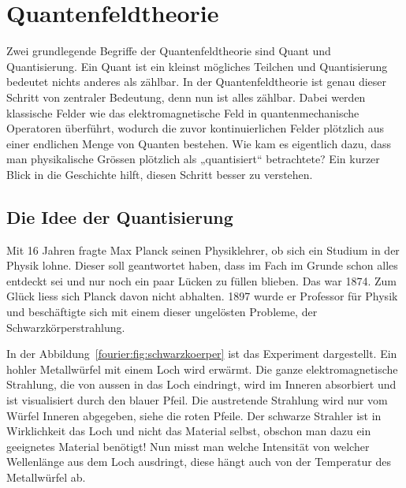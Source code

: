 %
%
%
%
\section{Quantenfeldtheorie\label{fourier:section:quantenfeldtheorie}}
Zwei grundlegende Begriffe der Quantenfeldtheorie sind Quant und Quantisierung. 
Ein Quant ist ein kleinst mögliches Teilchen und Quantisierung bedeutet nichts anderes als zählbar. 
In der Quantenfeldtheorie ist genau dieser Schritt von zentraler Bedeutung, denn nun ist alles zählbar. 
Dabei werden klassische Felder wie das elektromagnetische Feld in quantenmechanische Operatoren überführt, wodurch die zuvor kontinuierlichen Felder plötzlich aus einer endlichen Menge von Quanten bestehen.
Wie kam es eigentlich dazu, dass man physikalische Grössen plötzlich als „quantisiert“ betrachtete?
Ein kurzer Blick in die Geschichte hilft, diesen Schritt besser zu verstehen.

\subsection{Die Idee der Quantisierung\label{fourier:subsection:DieIdeeDerQuantisierung}}
	Mit 16 Jahren fragte Max Planck seinen Physiklehrer, ob sich ein Studium in der Physik lohne. 
	Dieser soll geantwortet haben, dass im Fach im Grunde schon alles entdeckt sei und nur noch ein paar Lücken zu füllen blieben.
	Das war 1874.
	Zum Glück liess sich Planck davon nicht abhalten.
	1897 wurde er Professor für Physik und beschäftigte sich mit einem dieser ungelösten Probleme, der Schwarzkörperstrahlung. 
	
	
	In der Abbildung~\ref{fourier:fig:schwarzkoerper} ist das Experiment dargestellt. Ein hohler Metallwürfel mit einem Loch wird erwärmt. 
	Die ganze elektromagnetische Strahlung, die von aussen in das Loch eindringt, wird im Inneren absorbiert und ist visualisiert durch den blauer Pfeil. 
	Die austretende Strahlung wird nur vom Würfel Inneren abgegeben, siehe die roten Pfeile. 
	Der schwarze Strahler ist in Wirklichkeit das Loch und nicht das Material selbst, obschon man dazu ein geeignetes Material benötigt!
	Nun misst man welche Intensität von welcher Wellenlänge aus dem Loch ausdringt, diese hängt auch von der Temperatur des Metallwürfel ab. 
	
